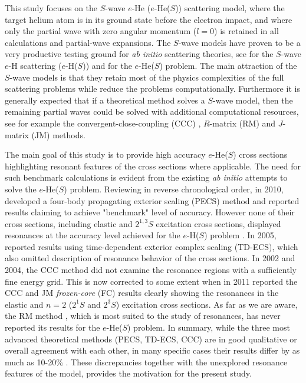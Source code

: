 \documentclass[aip
, pra
, showpacs
, aps
, twocolumn
, groupedaddress
, floatfix
]{revtex4}
\begin{document}
This study focuses on the $S$-wave $e$-He ($e$-He($S$)) scattering model,
where the target helium atom is in its ground state before the electron impact,
and where only the partial wave with zero angular momentum ($l=0$) is retained in all calculations
and partial-wave expansions.
The $S$-wave models have proven to be a very productive testing ground for {\it ab initio} scattering theories,
see \cite{T62,HY74p1209,P78,P80,P81,CO84,BS92p53,BST93,KM94pL407,IDHF95,PS96,JS02,JS00l,BRIM99,S99l,MHR02,BS04,Frapiccini10} for the $S$-wave $e$-H scattering ($e$-H($S$))
and \cite{DHIF94,PMR99,PBFS02,PNBFS04,HMR05R,HMR05,BS10p022715,BS10p022716,KFB11} for  the $e$-He($S$) problem.
The main attraction of the $S$-wave models is that they retain most of the physics complexities of the full
scattering problems while reduce the problems computationally.
Furthermore it is generally expected that if a theoretical method solves a $S$-wave model, then
the remaining partial waves could be solved with additional computational resources,
see for example the convergent-close-coupling (CCC) \cite{FB95},
$R$-matrix (RM) \cite{FLRS94b, PhysRevA.54.R998, SMC2006}
and $J$-matrix (JM) \cite{KM94pL741,KM95pL139} methods.


The main goal of this study is to provide high accuracy $e$-He($S$) cross sections highlighting resonant features of the cross sections where applicable.
The need for such benchmark calculations is evident from the existing {\em ab initio} attempts to solve the $e$-He($S$) problem.
Reviewing in reverse chronological order, in 2010, \citet{BS10p022715} developed a four-body propagating exterior scaling (PECS) method and reported results claiming to achieve "benchmark" level of accuracy.
However none of their cross sections, including elastic and $2^{1,3}S$ excitation cross sections,
displayed resonances at the accuracy level achieved for the $e$-H($S$) problem \cite{P78}.
In 2005, \citet{HMR05} reported results using
time-dependent exterior complex scaling (TD-ECS), which also omitted description of resonance behavior of the cross sections.
In 2002 and 2004, the CCC method \cite{PBFS02,PNBFS04} did not examine the resonance regions with a sufficiently fine energy grid.
This is now corrected to some extent when in 2011 \citet{KFB11} reported the CCC and JM {\em frozen-core}
(FC) results clearly showing the resonances in the elastic and $n=2$ ($2^1S$ and $2^3S$) excitation cross sections.
As far as we are aware, the RM method \cite{FLRS94b, SMC2006}, which is most suited to the study of resonances,
has never reported its results for the $e$-He($S$) problem.
In summary, while the three most advanced theoretical methods (PECS, TD-ECS, CCC) are in good qualitative or overall agreement with each other,
in many specific cases their results differ by as much as 10-20\% \cite{BS10p022715,HMR05}.
These discrepancies together with the unexplored resonance features of the model,
provides the motivation for the present study.
\end{document}
